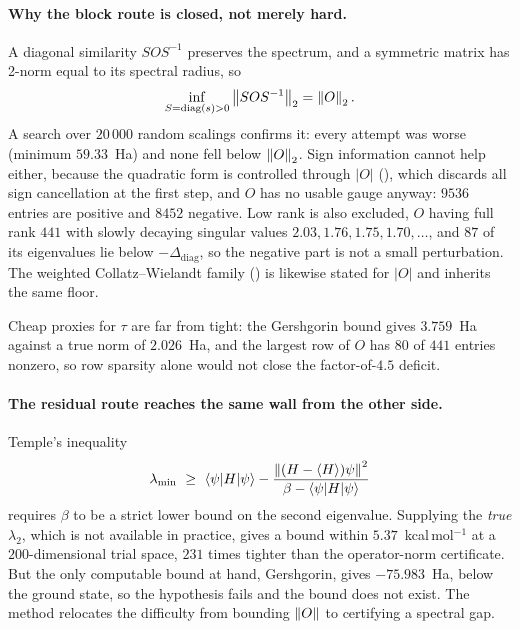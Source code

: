 \paragraph{Why the block route is closed, not merely hard.}
A diagonal similarity $SOS^{-1}$ preserves the spectrum, and a symmetric matrix has
2-norm equal to its spectral radius, so
\[
  \inf_{S=\operatorname{diag}(s)>0}\left\lVert SOS^{-1}\right\rVert_2 = \left\lVert O\right\rVert_2 .
\]
A search over $20\,000$ random scalings confirms it: every attempt was worse
(minimum $59.33$~Ha) and none fell below $\left\lVert O\right\rVert_2$. Sign information cannot help
either, because the quadratic form is controlled through $|O|$
(), which discards all sign cancellation at the first
step, and $O$ has no usable gauge anyway: $9536$ entries are positive and $8452$
negative. Low rank is also excluded, $O$ having full rank $441$ with slowly decaying
singular values $2.03,1.76,1.75,1.70,\dots$, and $87$ of its eigenvalues lie below
$-\Delta_{\mathrm{diag}}$, so the negative part is not a small perturbation. The
weighted Collatz--Wielandt family () is likewise
stated for $|O|$ and inherits the same floor.

Cheap proxies for $\tau$ are far from tight: the Gershgorin bound gives
$3.759$~Ha against a true norm of $2.026$~Ha, and the largest row of $O$ has $80$ of
$441$ entries nonzero, so row sparsity alone would not close the factor-of-$4.5$
deficit.

\paragraph{The residual route reaches the same wall from the other side.}
Temple's inequality
\[
  \lambda_{\min}\ \ge\ \langle\psi|H|\psi\rangle
   - \frac{\norm{(H-\langle H\rangle)\psi}^{2}}{\beta-\langle\psi|H|\psi\rangle}
\]
requires $\beta$ to be a strict lower bound on the second eigenvalue. Supplying the
\emph{true} $\lambda_2$, which is not available in practice, gives a bound within
$5.37$~kcal\,mol$^{-1}$ at a $200$-dimensional trial space, $231$ times tighter than
the operator-norm certificate. But the only computable bound at hand, Gershgorin,
gives $-75.983$~Ha, below the ground state, so the hypothesis fails and the bound
does not exist. The method relocates the difficulty from bounding $\left\lVert O\right\rVert$ to
certifying a spectral gap.

